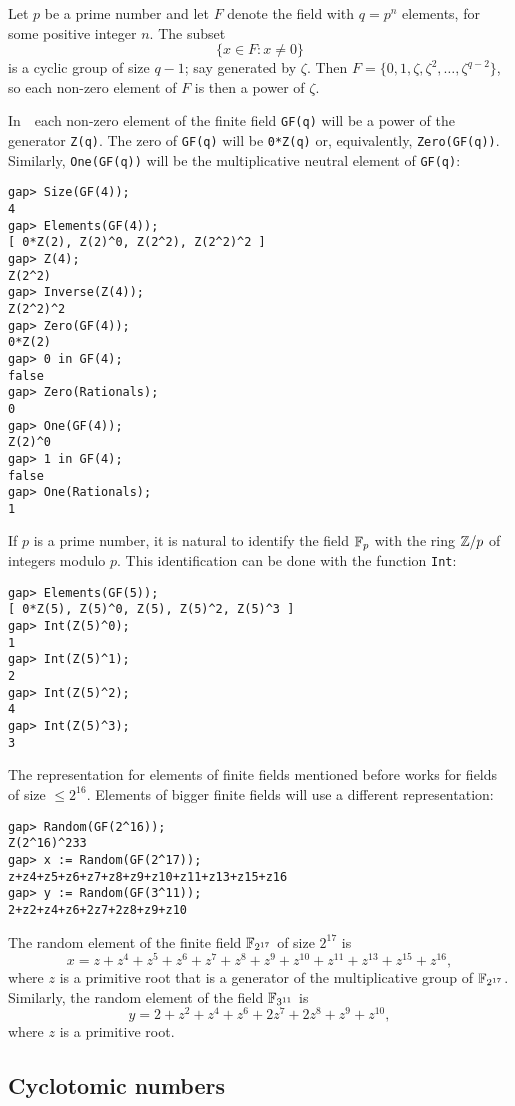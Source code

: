 Let $p$ be a prime number and let $F$ denote 
the field with $q=p^n$ elements, for some positive integer $n$. 
The subset 
\[
  \{x\in F:x\ne 0\}
\]
is a cyclic group of size $q-1$; say generated by $\zeta$. Then
$F=\{0,1,\zeta,\zeta^2,\dots,\zeta^{q-2}\}$, so each non-zero element of $F$ is
then a power of $\zeta$.  

In~\GAP~each non-zero element of the finite field
\lstinline{GF(q)} will be a power of the generator \lstinline{Z(q)}. The zero
of \lstinline{GF(q)} will be \lstinline{0*Z(q)} or, equivalently, 
\lstinline{Zero(GF(q))}. Similarly, 
\lstinline{One(GF(q))} will be the multiplicative
neutral element of \lstinline{GF(q)}:
\begin{lstlisting}
gap> Size(GF(4));
4
gap> Elements(GF(4));
[ 0*Z(2), Z(2)^0, Z(2^2), Z(2^2)^2 ]
gap> Z(4);
Z(2^2)
gap> Inverse(Z(4));
Z(2^2)^2
gap> Zero(GF(4));
0*Z(2)
gap> 0 in GF(4);
false
gap> Zero(Rationals);
0
gap> One(GF(4));
Z(2)^0
gap> 1 in GF(4);
false
gap> One(Rationals);
1
\end{lstlisting}

If $p$ is a prime number, it is natural to identify the field $\mathbb{F}_p$
with the ring $\mathbb{Z}/p$ of integers modulo $p$. 
This identification can be done with 
the function \lstinline{Int}:
\begin{lstlisting}
gap> Elements(GF(5));
[ 0*Z(5), Z(5)^0, Z(5), Z(5)^2, Z(5)^3 ]
gap> Int(Z(5)^0);
1
gap> Int(Z(5)^1);
2
gap> Int(Z(5)^2);
4
gap> Int(Z(5)^3);
3
\end{lstlisting}

\begin{remark}
The representation for elements of finite fields 
mentioned before works for fields of 
size $\leq 2^{16}$. Elements of bigger finite fields will 
use a different representation:
\begin{lstlisting}
gap> Random(GF(2^16));
Z(2^16)^233
gap> x := Random(GF(2^17));
z+z4+z5+z6+z7+z8+z9+z10+z11+z13+z15+z16
gap> y := Random(GF(3^11));
2+z2+z4+z6+2z7+2z8+z9+z10
\end{lstlisting}
The random element of the finite field $\mathbb{F}_{2^{17}}$ of size $2^{17}$ is
\[
x = z+z^4+z^5+z^6+z^7+z^8+z^9+z^{10}+z^{11}+z^{13}+z^{15}+z^{16},
\]
where $z$ is a primitive root that is  
a generator of the multiplicative group of $\mathbb{F}_{2^{17}}$. 
Similarly, 
the random element of the field $\mathbb{F}_{3^{11}}$ is 
\[
y=2+z^2+z^4+z^6+2z^7+2z^8+z^9+z^{10},
\]
where $z$ is a primitive root. 
\end{remark}

\subsection{Cyclotomic numbers}

